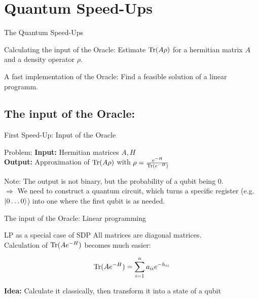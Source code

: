 \section{Quantum Speed-Ups}


\begin{frame}{The Quantum Speed-Ups}
 \begin{block}{Calculating the input of the Oracle:}
  Estimate $\operatorname{Tr}(A\rho)$ for a hermitian matrix $A$ and a density operator $\rho$.
 \end{block}
 
 \begin{block}{A fast implementation of the Oracle:}
  Find a feasible solution of a linear programm.
 \end{block}
\end{frame}

\subsection{The input of the Oracle:}

\begin{frame}{First Speed-Up: Input of the Oracle}
 \begin{block}{Problem:}
  \textbf{Input:} Hermitian matrices $A,H$ \\
  \textbf{Output:} Approximation of $\operatorname{Tr}(A\rho)$ with $\rho=\frac{e^{-H}}{\operatorname{Tr}(e^{-H})}$
 \end{block}
 
 \begin{block}{Note:}
  The output is not binary, but the probability of a qubit being $0$.\\
  \alert{$\Rightarrow$ We need to construct a quantum circuit, which turns a specific register (e.g. $\ket{0\ldots 0}$) into one where the first qubit is as needed.}
 \end{block} 
\end{frame}

\begin{frame}{The input of the Oracle: Linear programming}
\begin{block}{LP as a special case of SDP}
All matrices are diagonal matrices.\\
\alert{Calculation of $\operatorname{Tr}(Ae^{-H})$ becomes much easier:}

\begin{equation*}
\operatorname{Tr}(Ae^{-H})=\sum_{i=1}^n a_{ii}e^{-h_{ii}}
\end{equation*}

\end{block}

\vspace{1cm}

\textbf{Idea:} Calculate it classically, then transform it into a state of a qubit

\end{frame}


